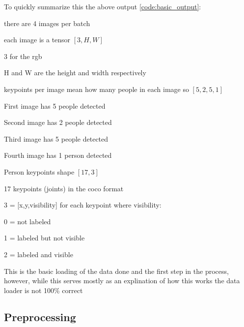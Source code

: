 To quickly summarize this the above output \ref{code:basic_output}:
\begin{compactitem}
   \item there are 4 images per batch
   \item each image is a tensor $[3,H,W]$
      \begin{compactitem}
         \item 3 for the rgb
         \item H and W are the height and width respectively   
      \end{compactitem}
   \item keypoints per image mean how many people in each image so $[5,2,5,1]$
      \begin{compactitem}
         \item First image has 5 people detected
         \item Second image has 2 people detected
         \item Third image has 5 people detected
         \item Fourth image has 1 person detected
      \end{compactitem}
   \item Person keypoints shape $[17,3]$

      \begin{compactitem}
         \item 17 keypoints (joints) in the coco format
         \item 3 = [x,y,visibility] for each keypoint where visibility:
            \begin{compactitem}
               \item 0 = not labeled
               \item 1 = labeled but not visible
               \item 2 = labeled and visible
            \end{compactitem}
      \end{compactitem}
\end{compactitem}

This is the basic loading of the data done and the first step in the process, however,
while this serves mostly as an explination of how this works the data loader is not 100\% correct

\subsection{Preprocessing}

